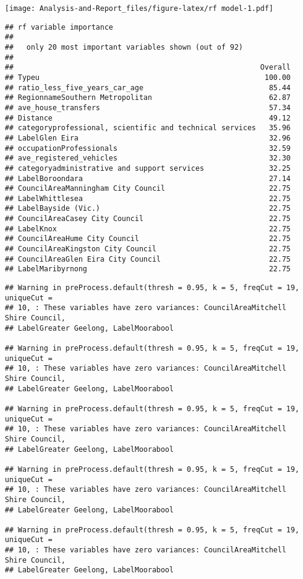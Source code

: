 \documentclass[
]{article}
\begin{document}
\texttt{[image: Analysis-and-Report\_files/figure-latex/rf model-1.pdf]}

\begin{verbatim}
## rf variable importance
## 
##   only 20 most important variables shown (out of 92)
## 
##                                                         Overall
## Typeu                                                    100.00
## ratio_less_five_years_car_age                             85.44
## RegionnameSouthern Metropolitan                           62.87
## ave_house_transfers                                       57.34
## Distance                                                  49.12
## categoryprofessional, scientific and technical services   35.96
## LabelGlen Eira                                            32.96
## occupationProfessionals                                   32.59
## ave_registered_vehicles                                   32.30
## categoryadministrative and support services               32.25
## LabelBoroondara                                           27.14
## CouncilAreaManningham City Council                        22.75
## LabelWhittlesea                                           22.75
## LabelBayside (Vic.)                                       22.75
## CouncilAreaCasey City Council                             22.75
## LabelKnox                                                 22.75
## CouncilAreaHume City Council                              22.75
## CouncilAreaKingston City Council                          22.75
## CouncilAreaGlen Eira City Council                         22.75
## LabelMaribyrnong                                          22.75
\end{verbatim}

\begin{verbatim}
## Warning in preProcess.default(thresh = 0.95, k = 5, freqCut = 19, uniqueCut =
## 10, : These variables have zero variances: CouncilAreaMitchell Shire Council,
## LabelGreater Geelong, LabelMoorabool

## Warning in preProcess.default(thresh = 0.95, k = 5, freqCut = 19, uniqueCut =
## 10, : These variables have zero variances: CouncilAreaMitchell Shire Council,
## LabelGreater Geelong, LabelMoorabool

## Warning in preProcess.default(thresh = 0.95, k = 5, freqCut = 19, uniqueCut =
## 10, : These variables have zero variances: CouncilAreaMitchell Shire Council,
## LabelGreater Geelong, LabelMoorabool

## Warning in preProcess.default(thresh = 0.95, k = 5, freqCut = 19, uniqueCut =
## 10, : These variables have zero variances: CouncilAreaMitchell Shire Council,
## LabelGreater Geelong, LabelMoorabool

## Warning in preProcess.default(thresh = 0.95, k = 5, freqCut = 19, uniqueCut =
## 10, : These variables have zero variances: CouncilAreaMitchell Shire Council,
## LabelGreater Geelong, LabelMoorabool
\end{verbatim}
\end{document}
